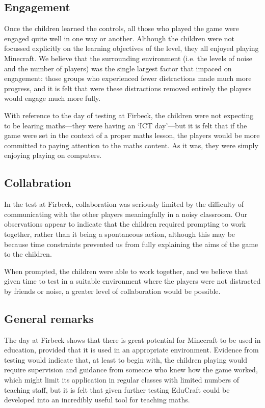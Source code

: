 \subsection{Engagement}
Once the children learned the controls, all those who played the game were engaged
quite well in one way or another. Although the children were not focussed
explicitly on the learning objectives of the level, they all enjoyed playing Minecraft.
We believe that the surrounding environment (i.e. the levels of noise and the number
of players) was the single largest factor that impaced on engagement: those groups
who experienced fewer distractions made much more progress, and it is felt that
were these distractions removed entirely the players would engage much more fully.

With reference to the day of testing at Firbeck, the children were not expecting to
be learing maths---they were having an `ICT day'---but it is felt that if the
game were set in the context of a proper maths lesson, the players would be more
committed to paying attention to the maths content. As it was, they were simply
enjoying playing on computers.

\subsection{Collabration}
In the test at Firbeck, collaboration was seriously limited by the difficulty of
communicating with the other players meaningfully in a noisy classroom. Our
observations appear to indicate that the children required prompting to work
together, rather than it being a spontaneous action, although this may be because
time constraints prevented us from fully explaining the aims of the game to
the children.

When prompted, the children were able to work together, and we believe that given
time to test in a suitable environment where the players were not distracted
by friends or noise, a greater level of collaboration would be possible.

\subsection{General remarks}
The day at Firbeck shows that there is great potential for Minecraft to be used
in education, provided that it is used in an appropriate environment. Evidence
from testing would indicate that, at least to begin with, the children playing
would require supervision and guidance from someone who knew how the game
worked, which might limit its application in regular classes with limited
numbers of teaching staff, but it is felt that given further testing EduCraft
could be developed into an incredibly useful tool for teaching maths.
